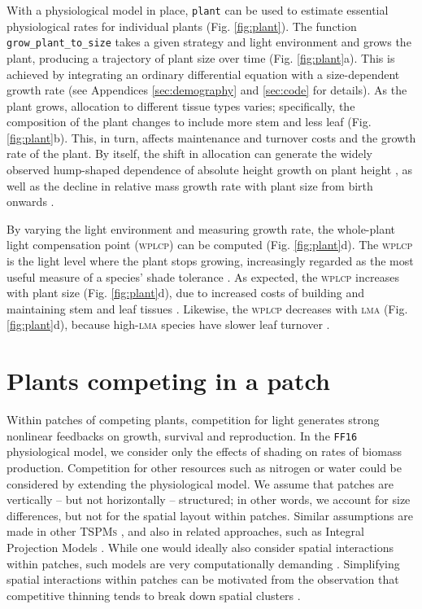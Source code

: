 \documentclass[a4paper,11pt]{article}
\newcommand{\plant}{\texttt{plant}}
\begin{document}
With a physiological model in place, {\plant} can be used to estimate
essential physiological rates for individual plants
(Fig. \ref{fig:plant}). The function \texttt{grow\_plant\_to\_size}
takes a given strategy and light environment and grows the plant,
producing a trajectory of plant size over time (Fig. \ref{fig:plant}a). This
is achieved by integrating an ordinary differential equation with a
size-dependent growth rate (see Appendices \ref{sec:demography} and
\ref{sec:code} for details). As the plant grows, allocation to
different tissue types varies; specifically, the composition of the plant
changes to include more stem and less leaf
(Fig. \ref{fig:plant}b). This, in turn, affects maintenance and turnover
costs and the growth rate of the plant. By itself, the
shift in allocation can generate the widely observed hump-shaped dependence
of absolute height growth on plant height \citep[Fig. \ref{fig:plant}c;][]{King-2011}, as well as the decline in relative mass growth rate with plant size from birth onwards \citep{Enquist-2007}.

By varying the light environment and measuring growth rate, the whole-plant light compensation point (\textsc{wplcp}) can be computed (Fig.
\ref{fig:plant}d). The \textsc{wplcp} is the light level where the plant
stops growing, increasingly regarded as the most useful
measure of a species' shade tolerance
\citep{Givnish-1988, Baltzer-2007, Lusk-2013}. As expected, the \textsc{wplcp}
increases with plant size (Fig. \ref{fig:plant}d), due to increased costs of building and
maintaining stem and leaf tissues \citep{Givnish-1988}. Likewise, the \textsc{wplcp}
decreases with \textsc{lma} (Fig. \ref{fig:plant}d), because high-\textsc{lma} species have slower leaf turnover \citep{Baltzer-2007, Lusk-2013}.

\section{Plants competing in a patch}

Within patches of competing plants, competition for light generates
strong nonlinear feedbacks on growth, survival and reproduction. In the
\texttt{FF16} physiological model, we consider only the effects of
shading on rates of biomass production. Competition for other
resources such as nitrogen or water could be considered by extending the
physiological model. We assume that patches are vertically -- but not horizontally --
structured; in other words, we account for size differences, but not for the spatial
layout within patches. Similar assumptions are made in other \textsc{TSPMs}
\citep{Shugart-1980, Kohyama-1993, Huston-1987, Moorcroft-2001, Smith-2014}, and also
in related approaches, such as Integral Projection Models \citep[e.g.,][]{Rees-2016}.
While one would ideally also consider spatial interactions within patches,
such models are very computationally demanding \citep{Shugart-1980,
Pacala-1996}. Simplifying spatial interactions within patches can be motivated from the observation
that competitive thinning tends to break down spatial clusters
\citep{Strigul-2008}.
\end{document}
